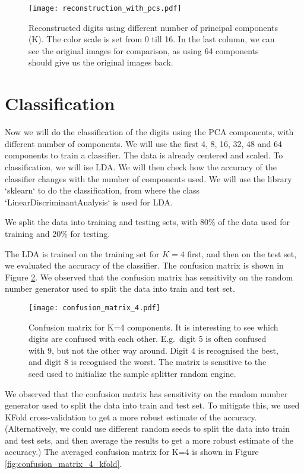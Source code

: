 \documentclass{article}
\begin{document}
\begin{figure}[ht!]
    \centering
    \texttt{[image: reconstruction\_with\_pcs.pdf]}
    \caption{Reconstructed digits using different number of principal components (K).
        The color scale is set from 0 till 16.
        In the last column, we can see the original images for comparison,
        as using 64 components should give us the original images back.}
    \label{fig:reconstruction_with_pcs}
\end{figure}

\section{Classification}
Now we will do the classification of the digits using the PCA components,
with different number of components.
We will use the first 4, 8, 16, 32, 48 and 64 components to train a classifier.
The data is already centered and scaled. To classification, we will ise LDA.
We will then check how the accuracy of the classifier changes with the number of components used.
We will use the library `sklearn` to do the classification,
from where the class `LinearDiscriminantAnalysis` is used for LDA.

We split the data into training and testing sets,
with 80\% of the data used for training and 20\% for testing.

The LDA is trained on the training set for $K=4$ first, and then on the test set,
we evaluated the accuracy of the classifier.
The confusion matrix is shown in Figure \ref{fig:confusion_matrix_4}.
We observed that the confusion matrix has sensitivity on the random number generator
used to split the data into train and test set.

\begin{figure}[ht!]
    \centering
    \texttt{[image: confusion\_matrix\_4.pdf]}
    \caption{Confusion matrix for K=4 components. It is interesting to see
        which digits are confused with each other. E.g.\ digit 5 is often confused with 9,
        but not the other way around.
        Digit 4 is recognised the best, and digit 8 is recognised the worst.
        The matrix is sensitive to the seed used to initialize the sample splitter random engine.}
    \label{fig:confusion_matrix_4}
\end{figure}

We observed that the confusion matrix has sensitivity on the random number generator
used to split the data into train and test set. To mitigate this,
we used KFold cross-validation to get a more robust estimate of the accuracy.
(Alternatively, we could use different random seeds to split the data into train and test sets,
and then average the results to get a more robust estimate of the accuracy.)
The averaged confusion matrix for K=4 is shown in Figure \ref{fig:confusion_matrix_4_kfold}.
\end{document}

